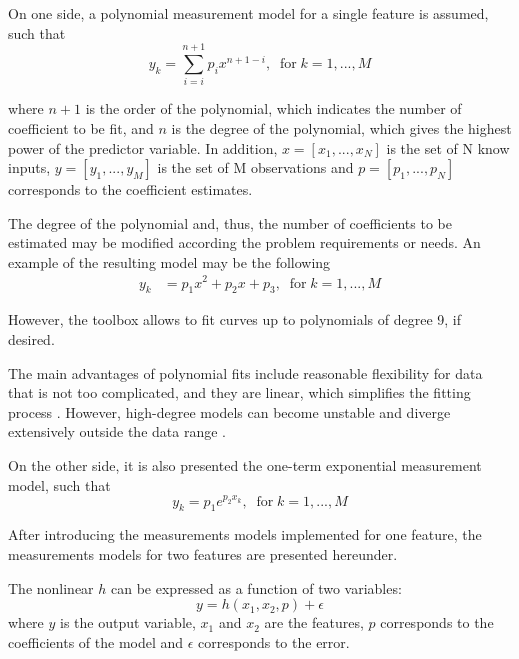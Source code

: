 \documentclass[a4paper, report, oneside, UKenglish]{memoir}
\begin{document}
On one side, a polynomial measurement model for a single feature is assumed, such that
\begin{equation}
    y_k = \sum\limits_{i=i}^{n+1} p_{i}x^{n+1-i},  \;\;\mbox{for}\; k = 1,...,M
\end{equation}

where $n+1$ is the order of the polynomial, which indicates the number of coefficient to be fit, and $n$ is the degree of the polynomial, which gives the highest power of the predictor variable. In addition, $x = [x_1,...,x_N]$ is the set of N know inputs, $y = [y_1,...,y_M]$ is the set of M observations and $p = [p_1,...,p_N]$ corresponds to the coefficient estimates.

The degree of the polynomial and, thus, the number of coefficients to be estimated may be modified according the problem requirements or needs. 
An example of the resulting model may be the following
\begin{equation}
\begin{split}
    y_k &= p_{1}x^{2} + p_{2}x + p_3,    \;\;\mbox{for}\; k = 1,...,M
\end{split}
\end{equation}

However, the toolbox allows to fit curves up to polynomials of degree 9, if desired. 

The main advantages of polynomial fits include reasonable flexibility for data that is not too complicated, and they are linear, which simplifies the fitting process \cite{MathWorksRegression}. However, high-degree models can become unstable and diverge extensively outside the data range \cite{MathWorksRegression}. 

On the other side, it is also presented the one-term exponential measurement model, such that 
\begin{equation}
    y_k = p_{1}e^{p_{2}x_{k}},  \;\;\mbox{for}\; k = 1,...,M
\end{equation}

After introducing the measurements models implemented for one feature, the measurements models for two features are presented hereunder.

The nonlinear $h$ can be expressed as a function of two variables:
\begin{equation}
    y = h(x_{1},x_{2},p) + \epsilon
\end{equation}
where $y$ is the output variable, $x_{1}$ and $x_{2}$ are the features, $p$ corresponds to the coefficients of the model and $\epsilon$ corresponds to the error. 
\end{document}
